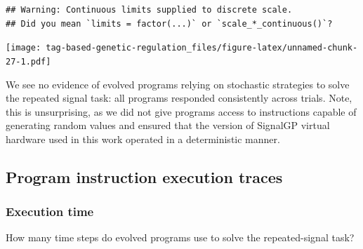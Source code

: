 \documentclass[
]{book}
\begin{document}
\begin{verbatim}
## Warning: Continuous limits supplied to discrete scale.
## Did you mean `limits = factor(...)` or `scale_*_continuous()`?
\end{verbatim}

\texttt{[image: tag-based-genetic-regulation\_files/figure-latex/unnamed-chunk-27-1.pdf]}

We see no evidence of evolved programs relying on stochastic strategies to solve the repeated signal task: all programs responded consistently across trials.
Note, this is unsurprising, as we did not give programs access to instructions capable of generating random values and ensured that the version of SignalGP virtual hardware used in this work operated in a deterministic manner.

\hypertarget{program-instruction-execution-traces}{%
\subsection{Program instruction execution traces}\label{program-instruction-execution-traces}}

\hypertarget{execution-time}{%
\subsubsection{Execution time}\label{execution-time}}

How many time steps do evolved programs use to solve the repeated-signal task?
\end{document}

